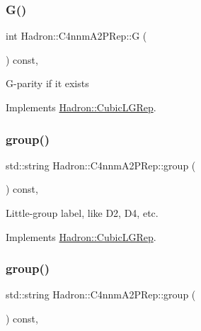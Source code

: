\subsubsection{\texorpdfstring{G()}{G()}\hspace{0.1cm}{\footnotesize\ttfamily [2/2]}}
{\footnotesize\ttfamily int Hadron\+::\+C4nnm\+A2\+P\+Rep\+::G (\begin{DoxyParamCaption}{ }\end{DoxyParamCaption}) const\hspace{0.3cm}{\ttfamily [inline]}, {\ttfamily [virtual]}}

G-\/parity if it exists 

Implements \mbox{\hyperlink{structHadron_1_1CubicLGRep_ace26f7b2d55e3a668a14cb9026da5231}{Hadron\+::\+Cubic\+L\+G\+Rep}}.

\mbox{\label{structHadron_1_1C4nnmA2PRep_abf4767f07f1caa4e9cb8c3ab9629a640}} 
\subsubsection{\texorpdfstring{group()}{group()}\hspace{0.1cm}{\footnotesize\ttfamily [1/2]}}
{\footnotesize\ttfamily std\+::string Hadron\+::\+C4nnm\+A2\+P\+Rep\+::group (\begin{DoxyParamCaption}{ }\end{DoxyParamCaption}) const\hspace{0.3cm}{\ttfamily [inline]}, {\ttfamily [virtual]}}

Little-\/group label, like D2, D4, etc. 

Implements \mbox{\hyperlink{structHadron_1_1CubicLGRep_a9bdb14b519a611d21379ed96a3a9eb41}{Hadron\+::\+Cubic\+L\+G\+Rep}}.

\mbox{\label{structHadron_1_1C4nnmA2PRep_abf4767f07f1caa4e9cb8c3ab9629a640}} 
\subsubsection{\texorpdfstring{group()}{group()}\hspace{0.1cm}{\footnotesize\ttfamily [2/2]}}
{\footnotesize\ttfamily std\+::string Hadron\+::\+C4nnm\+A2\+P\+Rep\+::group (\begin{DoxyParamCaption}{ }\end{DoxyParamCaption}) const\hspace{0.3cm}{\ttfamily [inline]}, {\ttfamily [virtual]}}

